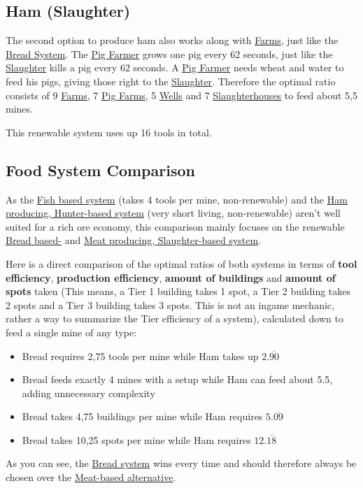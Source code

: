 \documentclass[11pt]{article}
\begin{document}
\subsection{Ham (Slaughter)}
\label{sec:hamslaughter}

The second option to produce ham also works along with \hyperref[farm]{Farms}, just like the \hyperref[bread]{Bread System}. The \hyperref[pigfarm]{Pig Farmer} grows one pig every 62 seconds, just like the \hyperref[slaughterhouse]{Slaughter} kills a pig every 62 seconds. A \hyperref[pigfarm]{Pig Farmer} needs wheat and water to feed his pigs, giving those right to the \hyperref[slaughterhouse]{Slaughter}. Therefore the optimal ratio consists of 9 \hyperref[farm]{Farms}, 7 \hyperref[pigfarm]{Pig Farms}, 5 \hyperref[well]{Wells} and 7 \hyperref[slaughterhouse]{Slaughterhouses} to feed about 5,5 mines.

This renewable system uses up 16 tools in total.

\subsection{Food System Comparison}
\label{sec:foodsystemcomparison}

As the \hyperref[fish]{Fish based system} (takes 4 tools per mine, non-renewable) and the \hyperref[hamhunter]{Ham producing, Hunter-based system} (very short living, non-renewable) aren't well suited for a rich ore economy, this comparison mainly focuses on the renewable \hyperref[bread]{Bread based-} and \hyperref[hamslaughter]{Meat producing, Slaughter-based system}.

Here is a direct comparison of the optimal ratios of both systems in terms of \textbf{tool efficiency}, \textbf{production efficiency}, \textbf{amount of buildings} and \textbf{amount of spots} taken (This means, a Tier 1 building takes 1 spot, a Tier 2 building takes 2 spots and a Tier 3 building takes 3 spots. This is not an ingame mechanic, rather a way to summarize the Tier efficiency of a system), calculated down to feed a single mine of any type:

\begin{itemize}
  \item Bread requires 2,75 tools per mine while Ham takes up $2.\overline{90}$
  \item Bread feeds exactly 4 mines with a setup while Ham can feed about 5.5, adding unnecessary complexity
  \item Bread takes 4,75 buildings per mine while Ham requires $5.\overline{09}$
  \item Bread takes 10,25 spots per mine while Ham requires $12.\overline{18}$
\end{itemize}

As you can see, the \hyperref[bread]{Bread system} wins every time and should therefore always be chosen over the \hyperref[hamslaughter]{Meat-based alternative}.
\end{document}
